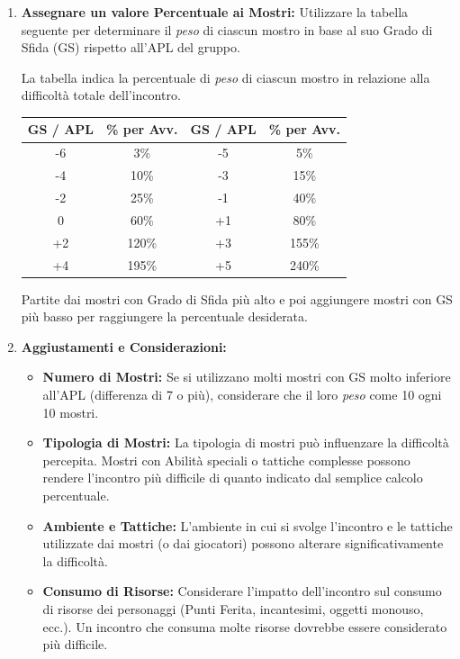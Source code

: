 \documentclass[a4paper,twoside,openany]{book}
\begin{document}
\begin{enumerate}[leftmargin=*]
	
	
	\item \textbf{Assegnare un valore Percentuale ai Mostri:} Utilizzare la tabella seguente per determinare il \emph{peso} di ciascun mostro in base al suo Grado di Sfida (GS) rispetto all'APL del gruppo.
	
	La tabella indica la percentuale di \emph{peso} di ciascun mostro in relazione alla difficoltà totale dell'incontro.
	
	\noindent\begin{tabular}{c|c|c|c}
		\textbf{GS / APL} & \textbf{\% per Avv.} &\textbf{GS / APL} & \textbf{\% per Avv.}\\
		\toprule
		-6 & 3\% &-5 & 5\% \\
		-4 & 10\% &-3 & 15\% \\
		-2 & 25\% &-1 & 40\% \\
		0 & 60\% & +1 & 80\% \\
		+2 & 120\% &+3 & 155\% \\
		+4 & 195\% & +5 & 240\% \\
	\end{tabular}
	
	Partite dai mostri con Grado di Sfida più alto e poi aggiungere mostri con GS più basso per raggiungere la percentuale desiderata.
	
	\item \textbf{Aggiustamenti e Considerazioni:}
	
	\begin{itemize}[leftmargin=*] \setlength{\itemsep}{0pt}
		\item \textbf{Numero di Mostri:} Se si utilizzano molti mostri con GS molto inferiore all'APL (differenza di 7 o più), considerare che il loro \emph{peso} come 10 ogni 10 mostri.
		\item \textbf{Tipologia di Mostri:} La tipologia di mostri può influenzare la difficoltà percepita. Mostri con Abilità speciali o tattiche complesse possono rendere l'incontro più difficile di quanto indicato dal semplice calcolo percentuale.
		\item \textbf{Ambiente e Tattiche:} L'ambiente in cui si svolge l'incontro e le tattiche utilizzate dai mostri (o dai giocatori) possono alterare significativamente la difficoltà.
		\item \textbf{Consumo di Risorse:} Considerare l'impatto dell'incontro sul consumo di risorse dei personaggi (Punti Ferita, incantesimi, oggetti monouso, ecc.). Un incontro che consuma molte risorse dovrebbe essere considerato più difficile.
	\end{itemize}
	

\end{enumerate}
\end{document}
